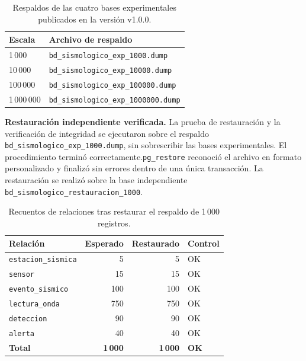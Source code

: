 \documentclass[12pt,a4paper]{article}
\begin{document}
\begin{table}[H]
\centering\small
\begin{tabular}{ll}
\toprule
\textbf{Escala} & \textbf{Archivo de respaldo} \\
\midrule
1\,000 & \nolinkurl{bd_sismologico_exp_1000.dump} \\
10\,000 & \nolinkurl{bd_sismologico_exp_10000.dump} \\
100\,000 & \nolinkurl{bd_sismologico_exp_100000.dump} \\
1\,000\,000 & \nolinkurl{bd_sismologico_exp_1000000.dump} \\
\bottomrule
\end{tabular}
\caption{Respaldos de las cuatro bases experimentales publicados en la versión v1.0.0.}
\label{tab:respaldos-experimentales}
\end{table}

\textbf{Restauración independiente verificada.} La prueba de
restauración y la verificación de integridad se ejecutaron sobre el respaldo
\nolinkurl{bd_sismologico_exp_1000.dump}, sin sobrescribir
las bases experimentales. El procedimiento terminó correctamente.\space\texttt{pg\_restore} reconoció el archivo en formato personalizado
y finalizó sin errores dentro de una única transacción. La
restauración se realizó sobre la base independiente
\nolinkurl{bd_sismologico_restauracion_1000}.

\begin{table}[H]
\centering\small
\begin{tabular}{lrrl}
\toprule
\textbf{Relación} & \textbf{Esperado} & \textbf{Restaurado} & \textbf{Control} \\
\midrule
\texttt{estacion\_sismica} & 5 & 5 & OK \\
\texttt{sensor} & 15 & 15 & OK \\
\texttt{evento\_sismico} & 100 & 100 & OK \\
\texttt{lectura\_onda} & 750 & 750 & OK \\
\texttt{deteccion} & 90 & 90 & OK \\
\texttt{alerta} & 40 & 40 & OK \\
\midrule
\textbf{Total} & \textbf{1\,000} & \textbf{1\,000} & \textbf{OK} \\
\bottomrule
\end{tabular}

\caption{Recuentos de relaciones tras restaurar el respaldo de 1\,000 registros.}
\label{tab:restauracion-verificada-1000}
\end{table}
\end{document}
